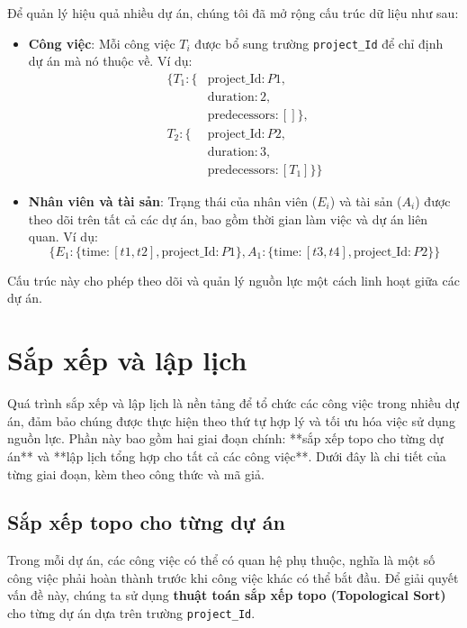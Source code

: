 \documentclass[a4paper,12pt]{article}
\begin{document}
Để quản lý hiệu quả nhiều dự án, chúng tôi đã mở rộng cấu trúc dữ liệu như sau:
\begin{itemize}
    \item \textbf{Công việc}: Mỗi công việc $T_i$ được bổ sung trường \texttt{project\_Id} để chỉ định dự án mà nó thuộc về. Ví dụ:
    \begin{align*}
    \{
    T_1: \{ & \text{project\_Id}: P1, \\
            & \text{duration}: 2, \\
            & \text{predecessors}: [] \}, \\
    T_2: \{ & \text{project\_Id}: P2, \\
            & \text{duration}: 3, \\
            & \text{predecessors}: [T_1] \} 
    \}
    \end{align*}
    \item \textbf{Nhân viên và tài sản}: Trạng thái của nhân viên ($E_i$) và tài sản ($A_i$) được theo dõi trên tất cả các dự án, bao gồm thời gian làm việc và dự án liên quan. Ví dụ:
    \[
    \{
    E_1: \{
        \text{time}: [t1, t2], 
        \text{project\_Id}: P1
    \}, 
    A_1: \{
        \text{time}: [t3, t4], 
        \text{project\_Id}: P2
    \} 
    \}
    \]
\end{itemize}

Cấu trúc này cho phép theo dõi và quản lý nguồn lực một cách linh hoạt giữa các dự án.

\section{Sắp xếp và lập lịch}

Quá trình sắp xếp và lập lịch là nền tảng để tổ chức các công việc trong nhiều dự án, đảm bảo chúng được thực hiện theo thứ tự hợp lý và tối ưu hóa việc sử dụng nguồn lực. Phần này bao gồm hai giai đoạn chính: **sắp xếp topo cho từng dự án** và **lập lịch tổng hợp cho tất cả các công việc**. Dưới đây là chi tiết của từng giai đoạn, kèm theo công thức và mã giả.

\subsection{Sắp xếp topo cho từng dự án}
Trong mỗi dự án, các công việc có thể có quan hệ phụ thuộc, nghĩa là một số công việc phải hoàn thành trước khi công việc khác có thể bắt đầu. Để giải quyết vấn đề này, chúng ta sử dụng \textbf{thuật toán sắp xếp topo (Topological Sort)} cho từng dự án dựa trên trường \texttt{project\_Id}.
\end{document}

